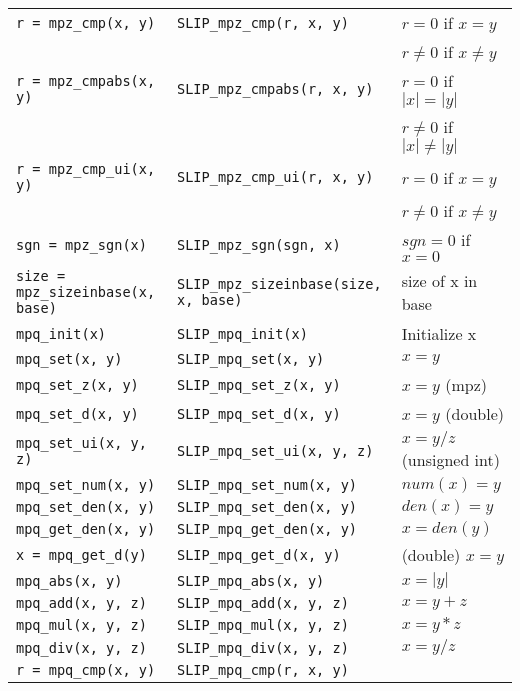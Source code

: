 \documentclass[12pt]{article}
\theoremstyle{definition}
\begin{document}
{\begin{center}
\begin{tabular}{|l|l|l|}
\verb|r = mpz_cmp(x, y)|
    & \verb|SLIP_mpz_cmp(r, x, y)|
    & $r = 0$ if $x=y$\\&& $r\neq 0$  if $x\neq y$ \\ \hline
\verb|r = mpz_cmpabs(x, y)|
    & \verb|SLIP_mpz_cmpabs(r, x, y)|
    & $r = 0$ if $|x|=|y|$\\&&  $r\neq 0$  if $|x|\neq |y|$\\ \hline
\verb|r = mpz_cmp_ui(x, y)|
    & \verb|SLIP_mpz_cmp_ui(r, x, y)|
    & $r = 0$ if $x=y$\\&&  $r\neq 0$  if $x\neq y$ \\ \hline
\verb|sgn = mpz_sgn(x)|
    & \verb|SLIP_mpz_sgn(sgn, x)|
    & $sgn = 0$ if $x = 0$ \\ \hline
\verb|size = mpz_sizeinbase(x, base)|
    & \verb|SLIP_mpz_sizeinbase(size, x, base)|
    & size of x in base \\ \hline
\verb|mpq_init(x)|
    & \verb|SLIP_mpq_init(x)|
    & Initialize x \\ \hline
\verb|mpq_set(x, y)|
    & \verb|SLIP_mpq_set(x, y)|
    & $x = y$ \\ \hline
\verb|mpq_set_z(x, y)|
    & \verb|SLIP_mpq_set_z(x, y)|
    & $x = y$ (mpz) \\ \hline
\verb|mpq_set_d(x, y)|
    & \verb|SLIP_mpq_set_d(x, y)|
    & $x=y$ (double) \\ \hline
\verb|mpq_set_ui(x, y, z)|
    & \verb|SLIP_mpq_set_ui(x, y, z)|
    & $x = y/z$ (unsigned int) \\ \hline
\verb|mpq_set_num(x, y)|
    & \verb|SLIP_mpq_set_num(x, y)|
    & $num(x) = y$ \\ \hline
\verb|mpq_set_den(x, y)|
    & \verb|SLIP_mpq_set_den(x, y)|
    & $den(x) = y$ \\ \hline
\verb|mpq_get_den(x, y)|
    & \verb|SLIP_mpq_get_den(x, y)|
    & $x = den(y)$ \\ \hline
\verb|x = mpq_get_d(y)|
    & \verb|SLIP_mpq_get_d(x, y)|
    & (double) $x = y$ \\ \hline
\verb|mpq_abs(x, y)|
    & \verb|SLIP_mpq_abs(x, y)|
    & $x = |y|$ \\ \hline
\verb|mpq_add(x, y, z)|
    & \verb|SLIP_mpq_add(x, y, z)|
    & $x = y+z$ \\ \hline
\verb|mpq_mul(x, y, z)|
    & \verb|SLIP_mpq_mul(x, y, z)|
    & $x = y*z$ \\ \hline
\verb|mpq_div(x, y, z)|
    & \verb|SLIP_mpq_div(x, y, z)|
    & $x = y/z$ \\ \hline
\verb|r = mpq_cmp(x, y)|
    & \verb|SLIP_mpq_cmp(r, x, y)|

\end{tabular}
\end{center}}
\end{document}

